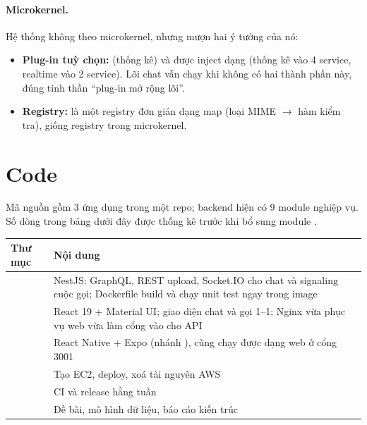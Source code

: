 \documentclass[11pt, a4paper]{article}
\begin{document}
\paragraph{Microkernel.} Hệ thống không theo microkernel, nhưng mượn hai ý tưởng của nó:
\begin{itemize}
  \item \textbf{Plug-in tuỳ chọn:}  (thống kê) và  được inject dạng  (thống kê vào 4 service, realtime vào 2 service). Lõi chat vẫn chạy khi không có hai thành phần này, đúng tinh thần ``plug-in mở rộng lõi''.
  \item \textbf{Registry:}  là một registry đơn giản dạng map (loại MIME $\rightarrow$ hàm kiểm tra), giống registry trong microkernel.
\end{itemize}

\section{Code}
\label{sec:code}

Mã nguồn gồm 3 ứng dụng trong một repo; backend hiện có 9 module nghiệp vụ. Số dòng trong bảng dưới đây được thống kê trước khi bổ sung module .

\begin{table}[H]
  \centering
  \small
  \begin{tabularx}{\linewidth}{lY}
    \toprule
    \textbf{Thư mục} & \textbf{Nội dung} \\
    \midrule
     & NestJS: GraphQL, REST upload, Socket.IO cho chat và signaling cuộc gọi; Dockerfile build và chạy unit test ngay trong image \\
     & React 19 + Material UI; giao diện chat và gọi 1--1; Nginx vừa phục vụ web vừa làm cổng vào cho API \\
     & React Native + Expo (nhánh ), cũng chạy được dạng web ở cổng 3001 \\
     & Tạo EC2, deploy, xoá tài nguyên AWS \\
     & CI và release hằng tuần \\
     & Đề bài, mô hình dữ liệu, báo cáo kiến trúc \\
    \bottomrule
  \end{tabularx}
\end{table}
\end{document}
